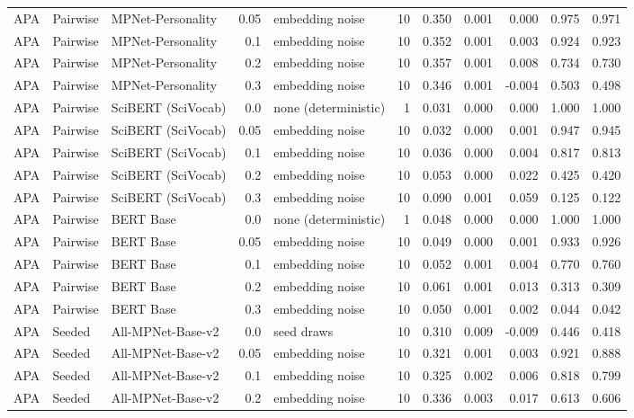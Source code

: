 \begin{table}[ht]
\begin{tabular}{lllrlrrrrrr}
APA & Pairwise & MPNet-Personality & 0.05 & embedding noise & 10 & 0.350 & 0.001 & 0.000 & 0.975 & 0.971 \\
APA & Pairwise & MPNet-Personality & 0.1 & embedding noise & 10 & 0.352 & 0.001 & 0.003 & 0.924 & 0.923 \\
APA & Pairwise & MPNet-Personality & 0.2 & embedding noise & 10 & 0.357 & 0.001 & 0.008 & 0.734 & 0.730 \\
APA & Pairwise & MPNet-Personality & 0.3 & embedding noise & 10 & 0.346 & 0.001 & -0.004 & 0.503 & 0.498 \\
APA & Pairwise & SciBERT (SciVocab) & 0.0 & none (deterministic) & 1 & 0.031 & 0.000 & 0.000 & 1.000 & 1.000 \\
APA & Pairwise & SciBERT (SciVocab) & 0.05 & embedding noise & 10 & 0.032 & 0.000 & 0.001 & 0.947 & 0.945 \\
APA & Pairwise & SciBERT (SciVocab) & 0.1 & embedding noise & 10 & 0.036 & 0.000 & 0.004 & 0.817 & 0.813 \\
APA & Pairwise & SciBERT (SciVocab) & 0.2 & embedding noise & 10 & 0.053 & 0.000 & 0.022 & 0.425 & 0.420 \\
APA & Pairwise & SciBERT (SciVocab) & 0.3 & embedding noise & 10 & 0.090 & 0.001 & 0.059 & 0.125 & 0.122 \\
APA & Pairwise & BERT Base & 0.0 & none (deterministic) & 1 & 0.048 & 0.000 & 0.000 & 1.000 & 1.000 \\
APA & Pairwise & BERT Base & 0.05 & embedding noise & 10 & 0.049 & 0.000 & 0.001 & 0.933 & 0.926 \\
APA & Pairwise & BERT Base & 0.1 & embedding noise & 10 & 0.052 & 0.001 & 0.004 & 0.770 & 0.760 \\
APA & Pairwise & BERT Base & 0.2 & embedding noise & 10 & 0.061 & 0.001 & 0.013 & 0.313 & 0.309 \\
APA & Pairwise & BERT Base & 0.3 & embedding noise & 10 & 0.050 & 0.001 & 0.002 & 0.044 & 0.042 \\
APA & Seeded & All-MPNet-Base-v2 & 0.0 & seed draws & 10 & 0.310 & 0.009 & -0.009 & 0.446 & 0.418 \\
APA & Seeded & All-MPNet-Base-v2 & 0.05 & embedding noise & 10 & 0.321 & 0.001 & 0.003 & 0.921 & 0.888 \\
APA & Seeded & All-MPNet-Base-v2 & 0.1 & embedding noise & 10 & 0.325 & 0.002 & 0.006 & 0.818 & 0.799 \\
APA & Seeded & All-MPNet-Base-v2 & 0.2 & embedding noise & 10 & 0.336 & 0.003 & 0.017 & 0.613 & 0.606 \\

\end{tabular}
\end{table}
